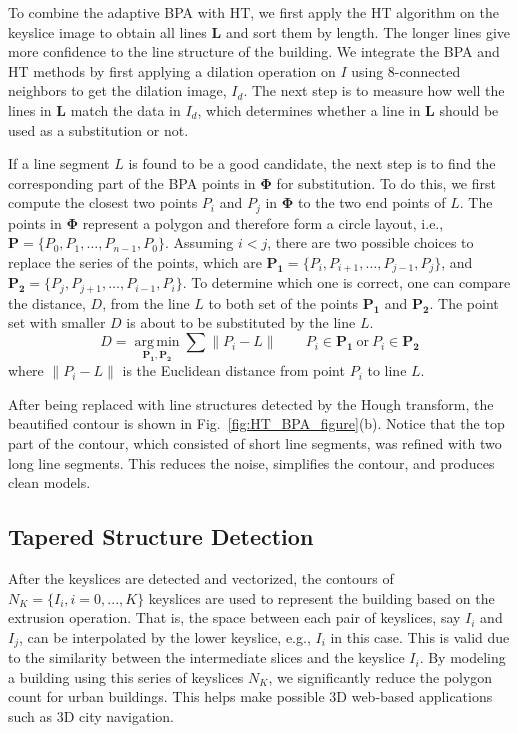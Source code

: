 \documentclass[review]{acmsiggraph}       %
\newcommand{\Figb}[1]{Fig.~\ref{fig:#1}(b)}
\begin{document}
To combine the adaptive BPA with HT, we first apply the HT algorithm on the
keyslice image to obtain all lines $\boldsymbol{L}$ and sort them by length. 
The longer lines give more confidence to the line structure of the building.
We integrate the BPA and HT methods by first applying a dilation operation on
$I$ using 8-connected neighbors to get the dilation image, $I_d$.
The next step is to measure how well the lines in $\boldsymbol{L}$ match the
data in $I_d$, which determines whether a line in $\boldsymbol{L}$
should be used as a substitution or not.

If a line segment $L$ is found to be a good candidate, the next step is to
find the corresponding part of the BPA points in $\boldsymbol{\Phi}$ for
substitution. To do this, we first compute the closest two points
$P_i$ and $P_j$ in $\boldsymbol{\Phi}$ to the two end points of $L$.
The points in $\boldsymbol{\Phi}$ represent a polygon and therefore form
a circle layout, i.e., $\boldsymbol{P} = \{ P_0,P_1,\ldots ,P_{n-1}, P_0 \}$.
Assuming $i < j$, there are two possible choices to replace
the series of the points, which are
$\boldsymbol{P_1} = \{ P_i,P_{i+1},\ldots,P_{j-1}, P_j \}$, and
$\boldsymbol{P_2} = \{ P_j,P_{j+1},\ldots,P_{i-1}, P_i \}$.
To determine which one is correct, one can compare the distance, $D$,
from the line $L$ to both set of the points $\boldsymbol{P_1}$ and
$\boldsymbol{P_2}$.
The point set with smaller $D$ is about to be substituted by the line $L$.
\begin{equation*}
D = \underset{\boldsymbol{P_1},\boldsymbol{P_2}}{\operatorname{arg\,min}}\sum{\lVert P_i - L \rVert}
\qquad P_i \in \boldsymbol{P_1} \ \text{or} \ P_i \in \boldsymbol{P_2}
\end{equation*}
where $\lVert P_i - L \rVert$ is the Euclidean distance from point $P_i$ to
line $L$.

After being replaced with line structures detected by the Hough transform,
the beautified contour is shown in \Figb{HT_BPA_figure}.
Notice that the top part of the contour, which consisted of short line
segments, was refined with two long line segments.
This reduces the noise, simplifies the contour, and produces clean models.

\subsection{Tapered Structure Detection}
\label{sec:tsd}

After the keyslices are detected and vectorized, the contours of
$N_K = \{I_{i}, i = 0, ..., K \}$ keyslices are used to represent
the building based on the extrusion operation.
That is, the space between each pair of keyslices, say $I_{i}$ and $I_{j}$,
can be interpolated by the lower keyslice, e.g., $I_{i}$ in this case.
This is valid due to the similarity between the intermediate slices
and the keyslice $I_{i}$.
By modeling a building using this series of keyslices $N_K$, we
significantly reduce the polygon count for urban buildings.
This helps make possible 3D web-based applications such as 3D city navigation.
\end{document}
